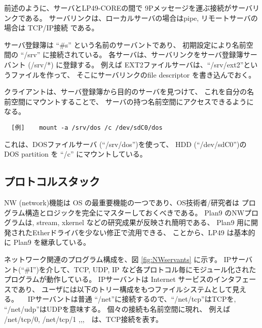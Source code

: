 \documentclass[draft]{ipsjpapers}
\begin{document}
前述のように、サーバとLP49-COREの間で 9Pメッセージを運ぶ接続がサーバリンクである。
サーバリンクは、ローカルサーバの場合はpipe, リモートサーバの場合は TCP/IP接続
である。

  サーバ登録簿は ``\#s'' という名前のサーバントであり、
  初期設定により名前空間の ``/srv'' に接続されている。
  各サーバは、サーバリンクをサーバ登録簿サーバント (/srv/*) に登録する。
  例えば EXT2ファイルサーバは、``/srv/ext2''というファイルを作って、
  そこにサーバリンクのfile descriptor を書き込んでおく。


  クライアントは、サーバ登録簿から目的のサーバを見つけて、
  これを自分の名前空間にマウントすることで、
  サーバの持つ名前空間にアクセスできるようになる。\\

\begin{verbatim}
  [例]    mount -a /srv/dos /c /dev/sdC0/dos 
\end{verbatim}

これは、DOSファイルサーバ (``/srv/dos'')を使って、
HDD (``/dev/sdC0'')のDOS partition を
``/c'' にマウントしている。


\subsection{プロトコルスタック}

    NW (network)機能は OS の最重要機能の一つであり、OS技術者/研究者は 
  プログラム構造とロジックを完全にマスターしておくべきである。
  Plan9 のNWプログラムは, 
  stream, xkernel などの研究成果が反映され簡明である、
  Plan9 用に開発されたEtherドライバを少ない修正で流用できる、
  ことから、LP49 は基本的に Plan9 を継承している。

  ネットワーク関連のプログラム構成を、図 \ref{fig:NWservants} に示す。
  IPサーバント(``\#I'')を介して、TCP, UDP, IP など各プロトコル毎にモジュール化された
  プログラムが動作している。
  IPサーバントは Internet サービスのインタフェースであり、
  ユーザには以下のトリー構成をもつファイルシステムとして見える。
　IPサーバントは普通 ``/net''に接続するので、``/net/tcp''はTCPを, 
  ``/net/udp''はUDPを意味する。
  個々の接続も名前空間に現れ、
  例えば /net/tcp/0, /net/tcp/1 ,,,　は、TCP接続を表す。
\end{document}
